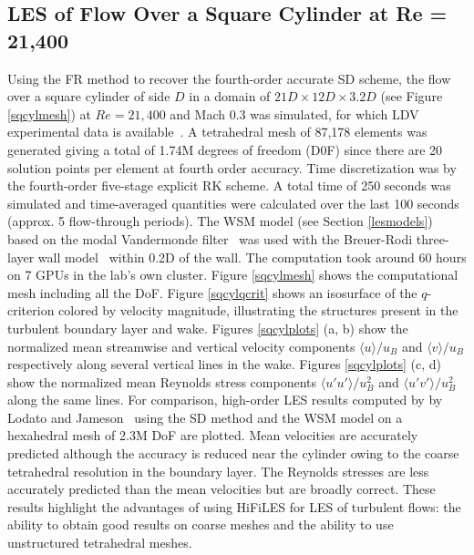 \graphicspath{{figures_squarecylinder/}}%

\subsection{LES of Flow Over a Square Cylinder at Re = 21,400}\label{sqcyl}

Using the FR method to recover the fourth-order accurate SD scheme, the flow over a square cylinder of side $D$ in a domain of $21D \times 12D \times 3.2D$ (see Figure \ref{sqcylmesh}) at $Re = 21,400$ and Mach 0.3 was simulated, for which LDV experimental data is available~\cite{lyn1994,lyn1995}.
A tetrahedral mesh of 87,178 elements was generated giving a total of 1.74M degrees of freedom (D0F) since there are 20 solution points per element at fourth order accuracy.
Time discretization was by the fourth-order five-stage explicit RK scheme.
A total time of 250 seconds was simulated and time-averaged quantities were calculated over the last 100 seconds (approx. 5 flow-through periods).
The WSM model (see Section \ref{lesmodels}) based on the modal Vandermonde filter~\cite{bull2014a} was used with the Breuer-Rodi three-layer wall model~\cite{breuer1994} within 0.2D of the wall.
The computation took around 60 hours on 7 GPUs in the lab's own cluster.
Figure \ref{sqcylmesh} shows the computational mesh including all the DoF.
Figure \ref{sqcylqcrit} shows an isosurface of the $q$-criterion colored by velocity magnitude, illustrating the structures present in the turbulent boundary layer and wake.
Figures \ref{sqcylplots} (a, b) show the normalized mean streamwise and vertical velocity components $\langle u \rangle/u_B$ and $\langle v \rangle/u_B$ respectively along several vertical lines in the wake.
Figures \ref{sqcylplots} (c, d) show the normalized mean Reynolds stress components $\langle u'u' \rangle/u_B^2$ and $\langle u'v' \rangle/u_B^2$ along the same lines.
For comparison, high-order LES results computed by by Lodato and Jameson~\cite{lodato2012b} using the SD method and the WSM model on a hexahedral mesh of 2.3M DoF are plotted.
Mean velocities are accurately predicted although the accuracy is reduced near the cylinder owing to the coarse tetrahedral resolution in the boundary layer.
The Reynolds stresses are less accurately predicted than the mean velocities but are broadly correct.
These results highlight the advantages of using HiFiLES for LES of turbulent flows: the ability to obtain good results on coarse meshes and the ability to use unstructured tetrahedral meshes.


